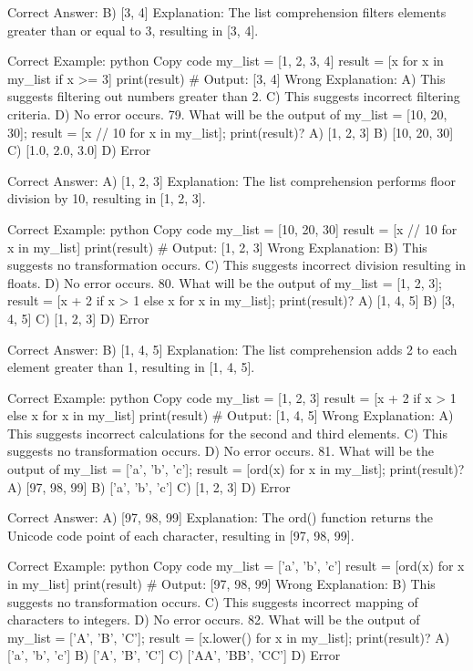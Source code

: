 Correct Answer: B) [3, 4]
Explanation: The list comprehension filters elements greater than or equal to 3, resulting in [3, 4].

Correct Example:
python
Copy code
my_list = [1, 2, 3, 4]
result = [x for x in my_list if x >= 3]
print(result)  # Output: [3, 4]
Wrong Explanation:
A) This suggests filtering out numbers greater than 2.
C) This suggests incorrect filtering criteria.
D) No error occurs.
79. What will be the output of my_list = [10, 20, 30]; result = [x // 10 for x in my_list]; print(result)?
A) [1, 2, 3]
B) [10, 20, 30]
C) [1.0, 2.0, 3.0]
D) Error

Correct Answer: A) [1, 2, 3]
Explanation: The list comprehension performs floor division by 10, resulting in [1, 2, 3].

Correct Example:
python
Copy code
my_list = [10, 20, 30]
result = [x // 10 for x in my_list]
print(result)  # Output: [1, 2, 3]
Wrong Explanation:
B) This suggests no transformation occurs.
C) This suggests incorrect division resulting in floats.
D) No error occurs.
80. What will be the output of my_list = [1, 2, 3]; result = [x + 2 if x > 1 else x for x in my_list]; print(result)?
A) [1, 4, 5]
B) [3, 4, 5]
C) [1, 2, 3]
D) Error

Correct Answer: B) [1, 4, 5]
Explanation: The list comprehension adds 2 to each element greater than 1, resulting in [1, 4, 5].

Correct Example:
python
Copy code
my_list = [1, 2, 3]
result = [x + 2 if x > 1 else x for x in my_list]
print(result)  # Output: [1, 4, 5]
Wrong Explanation:
A) This suggests incorrect calculations for the second and third elements.
C) This suggests no transformation occurs.
D) No error occurs.
81. What will be the output of my_list = ['a', 'b', 'c']; result = [ord(x) for x in my_list]; print(result)?
A) [97, 98, 99]
B) ['a', 'b', 'c']
C) [1, 2, 3]
D) Error

Correct Answer: A) [97, 98, 99]
Explanation: The ord() function returns the Unicode code point of each character, resulting in [97, 98, 99].

Correct Example:
python
Copy code
my_list = ['a', 'b', 'c']
result = [ord(x) for x in my_list]
print(result)  # Output: [97, 98, 99]
Wrong Explanation:
B) This suggests no transformation occurs.
C) This suggests incorrect mapping of characters to integers.
D) No error occurs.
82. What will be the output of my_list = ['A', 'B', 'C']; result = [x.lower() for x in my_list]; print(result)?
A) ['a', 'b', 'c']
B) ['A', 'B', 'C']
C) ['AA', 'BB', 'CC']
D) Error

